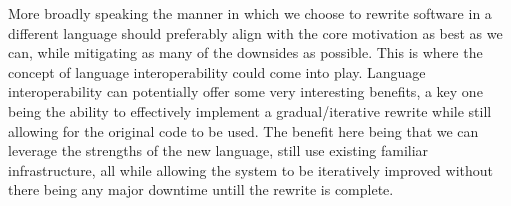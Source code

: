 More broadly speaking the manner in which we choose to rewrite software in a different language should preferably align with the core motivation as best as we can, while mitigating as many of the downsides as possible. This is where the concept of language interoperability could come into play. Language interoperability can potentially offer some very interesting benefits, a key one being the ability to effectively implement a gradual/iterative rewrite while still allowing for the original code to be used. The benefit here being that we can leverage the strengths of the new language, still use existing familiar infrastructure, all while allowing the system to be iteratively improved without there being any major downtime untill the rewrite is complete.




